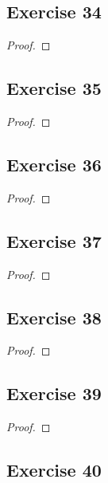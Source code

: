\documentclass[14pt]{extarticle}
\begin{document}
\subsection{Exercise 34}

\begin{proof}

\end{proof}

\subsection{Exercise 35}

\begin{proof}

\end{proof}

\subsection{Exercise 36}

\begin{proof}

\end{proof}

\subsection{Exercise 37}

\begin{proof}

\end{proof}

\subsection{Exercise 38}

\begin{proof}

\end{proof}

\subsection{Exercise 39}

\begin{proof}

\end{proof}

\subsection{Exercise 40}
\end{document}
